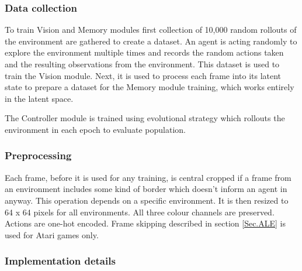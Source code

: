 \subsubsection{Data collection}

To train Vision and Memory modules first collection of 10,000 random rollouts of the environment are gathered to create a dataset. An agent is acting randomly to explore the environment multiple times and records the random actions taken and the resulting observations from the environment.
This dataset is used to train the Vision module. Next, it is used to process each frame into its latent state to prepare a dataset for the Memory module training, which works entirely in the latent space.

The Controller module is trained using evolutional strategy which rollouts the environment in each epoch to evaluate population.

\subsubsection{Preprocessing}

Each frame, before it is used for any training, is central cropped if a frame from an environment includes some kind of border which doesn't inform an agent in anyway. This operation depends on a specific environment. It is then resized to 64 x 64 pixels for all environments. All three colour channels are preserved. Actions are one-hot encoded. Frame skipping described in section \ref{Sec.ALE} is used for Atari games only.

\subsubsection{Implementation details}

